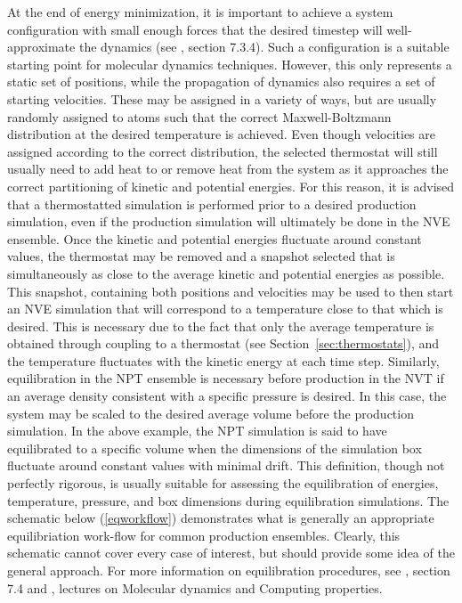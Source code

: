 \documentclass[9pt,bestpractices]{livecoms}
\begin{document}
At the end of energy minimization, it is important to achieve a system configuration with small enough forces that the desired timestep will well-approximate the dynamics (see \citet{LeachBook}, section 7.3.4).
Such a configuration is a suitable starting point for molecular dynamics techniques.
However, this only represents a static set of positions, while the propagation of dynamics also requires a set of starting velocities.
These may be assigned in a variety of ways, but are usually randomly assigned to atoms such that the correct Maxwell-Boltzmann distribution at the desired temperature is achieved.
Even though velocities are assigned according to the correct distribution, the selected thermostat will still usually need to add heat to or remove heat from the system as it approaches the correct partitioning of kinetic and potential energies.
For this reason, it is advised that a thermostatted simulation is performed prior to a desired production simulation, even if the production simulation will ultimately be done in the NVE ensemble.
Once the kinetic and potential energies fluctuate around constant values, the thermostat may be removed and a snapshot selected that is simultaneously as close to the average kinetic and potential energies as possible.
This snapshot, containing both positions and velocities may be used to then start an NVE simulation that will correspond to a temperature close to that which is desired.
This is necessary due to the fact that only the average temperature is obtained through coupling to a thermostat (see Section~\ref{sec:thermostats}), and the temperature fluctuates with the kinetic energy at each time step.
Similarly, equilibration in the NPT ensemble is necessary before production in the NVT if an average density consistent with a specific pressure is desired.
In this case, the system may be scaled to the desired average volume before the production simulation.
In the above example, the NPT simulation is said to have equilibrated to a specific volume when the dimensions of the simulation box fluctuate around constant values with minimal drift. 
This definition, though not perfectly rigorous, is usually suitable for assessing the equilibration of energies, temperature, pressure, and box dimensions during equilibration simulations.
The schematic below (\ref{eqworkflow}) demonstrates what is generally an appropriate equilibriation work-flow for common production ensembles.
Clearly, this schematic cannot cover every case of interest, but should provide some idea of the general approach.
For more information on equilibration procedures, see \citet{LeachBook}, section 7.4 and \citet{ShellNotes}, lectures on Molecular dynamics and Computing properties.
\end{document}
